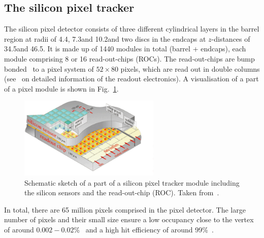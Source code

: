 \subsection*{The silicon pixel tracker}
The silicon pixel detector consists of three different cylindrical layers in the barrel region at radii of 4.4\cm, 7.3\cm and 10.2\cm and two discs in the endcaps at $z$-distances of 34.5\cm and 46.5\cm.
It is made up of 1440 modules in total (barrel + endcaps), each module comprising 8 or 16 read-out-chips (ROCs).
The read-out-chips are bump bonded~\cite{Thesis_Jenny} to a pixel system of $52\times80$ pixels, which are read out in double columns (see~\cite{Thesis_Jenny} on detailed information of the readout electronics).
A visualisation of a part of a pixel module is shown in Fig.~\ref{fig:PixelTracker}.
\begin{figure}[!b]
  \centering
      \includegraphics[width=0.60\textwidth]{figures/experiment/CMS/Pixelement.png}
  \caption{Schematic sketch of a part of a silicon pixel tracker module including the silicon sensors and the read-out-chip (ROC). Taken from~\cite{bib:PixelModule}.}  
  \label{fig:PixelTracker}
\end{figure}
In total, there are 65 million pixels comprised in the pixel detector.
The large number of pixels and their small size ensure a low occupancy close to the vertex of around $0.002 - 0.02$\%~\cite{bib:CMS:tracking_8TeV} and a high hit efficiency of around 99\%~\cite{bib:CMS:PixelSpatialResolution}. 

